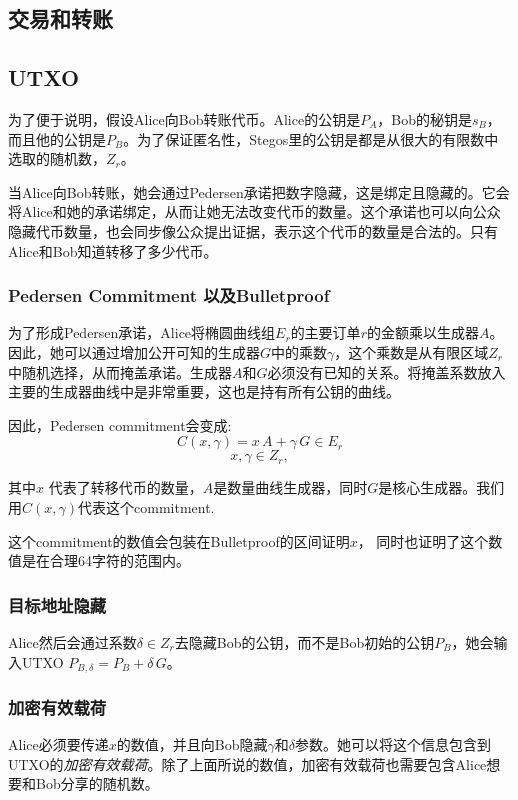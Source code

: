 \documentclass[8pt,fleqn,openany]{book}
\begin{document}
\begin{CJK*}{UTF8}{gbsn}
{\newpage \appendix
{}
\addappheadtotoc

\chapter{交易和转账}

\section{UTXO}
为了便于说明，假设Alice向Bob转账代币。Alice的公钥是$P_A$，Bob的秘钥是$s_B$，而且他的公钥是$P_B$。为了保证匿名性，Stegos里的公钥是都是从很大的有限数中选取的随机数，$Z_r$。

当Alice向Bob转账，她会通过Pedersen承诺把数字隐藏，这是绑定且隐藏的。它会将Alice和她的承诺绑定，从而让她无法改变代币的数量。这个承诺也可以向公众隐藏代币数量，也会同步像公众提出证据，表示这个代币的数量是合法的。只有Alice和Bob知道转移了多少代币。

\subsection{Pedersen Commitment 以及Bulletproof} 为了形成Pedersen承诺，Alice将椭圆曲线组$E_r$的主要订单$r$的金额乘以生成器$A$。因此，她可以通过增加公开可知的生成器$G$中的乘数$\gamma$，这个乘数是从有限区域$Z_r$中随机选择，从而掩盖承诺。生成器$A$和$G$必须没有已知的关系。将掩盖系数放入主要的生成器曲线中是非常重要，这也是持有所有公钥的曲线。

因此，Pedersen commitment会变成:
$$ C(x, \gamma) = x \, A + \gamma \, G \in E_r$$
$$x, \gamma \in Z_r,$$

其中$x$ 代表了转移代币的数量，$A$是数量曲线生成器，同时$G$是核心生成器。我们用$C(x, \gamma)$代表这个commitment.

这个commitment的数值会包装在Bulletproof的区间证明$x$， 同时也证明了这个数值是在合理64字符的范围内。

\subsection{目标地址隐藏} Alice然后会通过系数$\delta \in Z_r$去隐藏Bob的公钥，而不是Bob初始的公钥$P_B$，她会输入UTXO $P_{B, \delta} = P_B + \delta \, G$。

\subsection{加密有效载荷} Alice必须要传递$x$的数值，并且向Bob隐藏$\gamma$和$\delta$参数。她可以将这个信息包含到UTXO的\textit{加密有效载荷}。除了上面所说的数值，加密有效载荷也需要包含Alice想要和Bob分享的随机数。

}
\end{CJK*}
\end{document}
